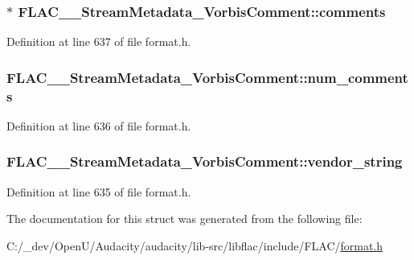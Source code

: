\subsubsection[{\texorpdfstring{comments}{comments}}]{$\ast$ F\+L\+A\+C\+\_\+\+\_\+\+Stream\+Metadata\+\_\+\+Vorbis\+Comment\+::comments}\hypertarget{struct_f_l_a_c_____stream_metadata___vorbis_comment_ab4065e0e2fcaac759616e9e339acfa19}{}\label{struct_f_l_a_c_____stream_metadata___vorbis_comment_ab4065e0e2fcaac759616e9e339acfa19}


Definition at line 637 of file format.\+h.

\subsubsection[{\texorpdfstring{num\+\_\+comments}{num_comments}}]{ F\+L\+A\+C\+\_\+\+\_\+\+Stream\+Metadata\+\_\+\+Vorbis\+Comment\+::num\+\_\+comments}\hypertarget{struct_f_l_a_c_____stream_metadata___vorbis_comment_a6b5a521443691bc3f195c97b60203a3e}{}\label{struct_f_l_a_c_____stream_metadata___vorbis_comment_a6b5a521443691bc3f195c97b60203a3e}


Definition at line 636 of file format.\+h.

\subsubsection[{\texorpdfstring{vendor\+\_\+string}{vendor_string}}]{ F\+L\+A\+C\+\_\+\+\_\+\+Stream\+Metadata\+\_\+\+Vorbis\+Comment\+::vendor\+\_\+string}\hypertarget{struct_f_l_a_c_____stream_metadata___vorbis_comment_a7a6dd7bacee57f0a59ac2d843cb79f98}{}\label{struct_f_l_a_c_____stream_metadata___vorbis_comment_a7a6dd7bacee57f0a59ac2d843cb79f98}


Definition at line 635 of file format.\+h.



The documentation for this struct was generated from the following file\+:\begin{DoxyCompactItemize}
\item 
C\+:/\+\_\+dev/\+Open\+U/\+Audacity/audacity/lib-\/src/libflac/include/\+F\+L\+A\+C/\hyperlink{include_2_f_l_a_c_2format_8h}{format.\+h}\end{DoxyCompactItemize}
